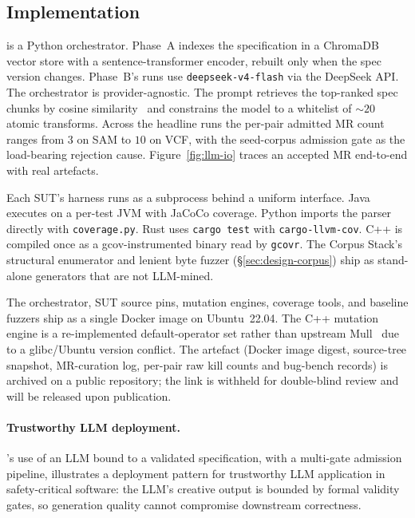 \subsection{Implementation}
\label{sec:implementation}

\biotest{} is a Python orchestrator. Phase~A indexes the
specification in a ChromaDB vector store with a
sentence-transformer encoder, rebuilt only when the spec version
changes. Phase~B's runs use \texttt{deepseek-v4-flash} via the
DeepSeek API. The orchestrator is provider-agnostic. The prompt
retrieves the top-ranked spec chunks by cosine
similarity~\citep{lewis2020rag} and constrains the model to a
whitelist of $\sim 20$ atomic transforms. Across the headline
runs the per-pair admitted MR count ranges from $3$ on SAM to
$10$ on VCF, with the seed-corpus admission gate as the
load-bearing rejection cause. Figure~\ref{fig:llm-io} traces an
accepted MR end-to-end with real artefacts.



Each SUT's harness runs as a subprocess behind a uniform
interface. Java executes on a per-test JVM with JaCoCo coverage.
Python imports the parser directly with \texttt{coverage.py}.
Rust uses \texttt{cargo test} with \texttt{cargo-llvm-cov}.
C++ is compiled once as a gcov-instrumented binary read by
\texttt{gcovr}. The Corpus Stack's structural enumerator and
lenient byte fuzzer (\S\ref{sec:design-corpus}) ship as
stand-alone generators that are not LLM-mined.

The orchestrator, SUT source pins, mutation engines, coverage
tools, and baseline fuzzers ship as a single Docker image on
Ubuntu~22.04. The C++ mutation engine is a re-implemented
default-operator set rather than upstream
Mull~\citep{denisov2018mull} due to a glibc/Ubuntu version
conflict. The artefact (Docker image digest, source-tree
snapshot, MR-curation log, per-pair raw kill counts and bug-bench
records) is archived on a public repository; the link is
withheld for double-blind review and will be released upon
publication.

\paragraph{Trustworthy LLM deployment.}
\biotest{}'s use of an LLM bound to a validated specification,
with a multi-gate admission pipeline, illustrates a deployment
pattern for trustworthy LLM application in safety-critical
software: the LLM's creative output is bounded by formal validity
gates, so generation quality cannot compromise downstream
correctness.
